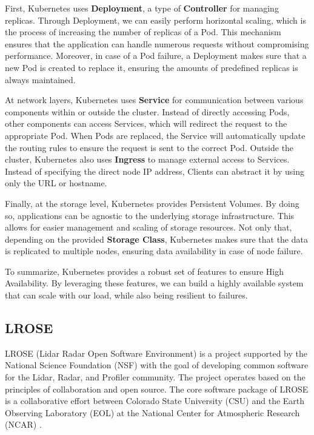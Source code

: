 First, Kubernetes uses \textbf{Deployment}, a type of \textbf{Controller} for managing replicas.
Through Deployment, we can easily perform horizontal scaling, which is the process of increasing the number of replicas of a Pod.
This mechanism ensures that the application can handle numerous requests without compromising performance.
Moreover, in case of a Pod failure, a Deployment makes sure that a new Pod is created to replace it, ensuring the amounts of predefined replicas is always maintained.

At network layers, Kubernetes uses \textbf{Service} for communication between various components within or outside the cluster.
Instead of directly accessing Pods, other components can access Services, which will redirect the request to the appropriate Pod.
When Pods are replaced, the Service will automatically update the routing rules to ensure the request is sent to the correct Pod.
Outside the cluster, Kubernetes also uses \textbf{Ingress} to manage external access to Services.
Instead of specifying the direct node IP address, Clients can abstract it by using only the URL or hostname.

Finally, at the storage level, Kubernetes provides Persistent Volumes.
By doing so, applications can be agnostic to the underlying storage infrastructure.
This allows for easier management and scaling of storage resources.
Not only that, depending on the provided \textbf{Storage Class}, Kubernetes makes sure that the data is replicated to multiple nodes,
ensuring data availability in case of node failure.

To summarize, Kubernetes provides a robust set of features to ensure High Availability.
By leveraging these features, we can build a highly available system that can scale with our load, while also being resilient to failures.

\subsection{LROSE}

LROSE (Lidar Radar Open Software Environment) is a project supported by the National Science Foundation (NSF) with the goal of developing common software for the Lidar, Radar, and Profiler community. The project operates based on the principles of collaboration and open source. The core software package of LROSE is a collaborative effort between Colorado State University (CSU) and the Earth Observing Laboratory (EOL) at the National Center for Atmospheric Research (NCAR) \cite{lrose}.

